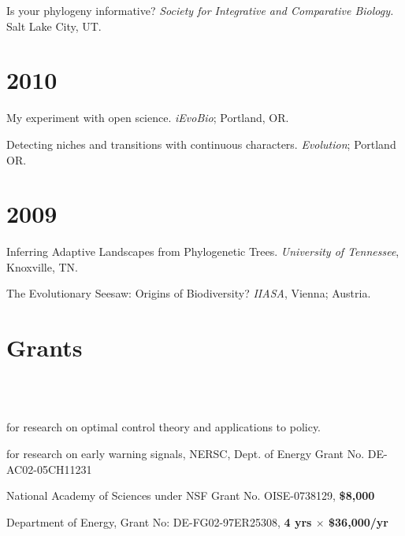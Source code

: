 \documentclass[margin]{res}
\begin{document}
\begin{resume}
  Is your phylogeny informative? \emph{Society for Integrative and Comparative Biology.} Salt Lake City, UT. 


 \section{\textnormal{2010}}
  My experiment with open science. \emph{iEvoBio}; Portland, OR. 

  Detecting niches and transitions with continuous characters.  \emph{Evolution}; Portland OR.

 \section{\textnormal{2009}}
  Inferring Adaptive Landscapes from Phylogenetic Trees. \emph{University of Tennessee}, Knoxville, TN.

  The Evolutionary Seesaw: Origins of Biodiversity? \emph{IIASA}, Vienna; Austria. 

\section{Grants}
\begin{format}
\\
\body\\
\end{format}

\begin{position} 
for research on optimal control theory and applications to policy.  
\end{position}

\begin{position} 
for research on early warning signals, NERSC, Dept. of Energy Grant No. DE-AC02-05CH11231
\end{position}

\begin{position} 
  National Academy of Sciences under NSF Grant No. OISE-0738129, \textbf{\$8,000}
\end{position}

\begin{position} 
  Department of Energy, Grant No: DE-FG02-97ER25308, \textbf{4 yrs $\times$ \$36,000/yr}
\end{position}



\end{resume}
\end{document}
